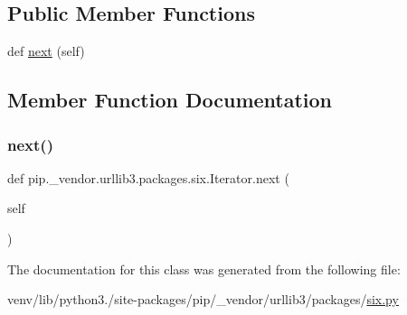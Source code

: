 \subsection*{Public Member Functions}
\begin{DoxyCompactItemize}
\item 
def \hyperlink{classpip_1_1__vendor_1_1urllib3_1_1packages_1_1six_1_1Iterator_ae672607d7c9bb84289b54dfcadd3b753}{next} (self)
\end{DoxyCompactItemize}


\subsection{Member Function Documentation}
\mbox{\label{classpip_1_1__vendor_1_1urllib3_1_1packages_1_1six_1_1Iterator_ae672607d7c9bb84289b54dfcadd3b753}} 
\subsubsection{\texorpdfstring{next()}{next()}}
{\footnotesize\ttfamily def pip.\+\_\+vendor.\+urllib3.\+packages.\+six.\+Iterator.\+next (\begin{DoxyParamCaption}\item[{}]{self }\end{DoxyParamCaption})}



The documentation for this class was generated from the following file\+:\begin{DoxyCompactItemize}
\item 
venv/lib/python3./site-\/packages/pip/\+\_\+vendor/urllib3/packages/\hyperlink{pip_2__vendor_2urllib3_2packages_2six_8py}{six.\+py}\end{DoxyCompactItemize}
